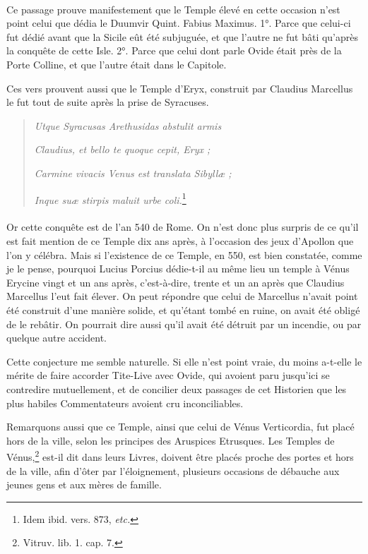 \documentclass[a4paper, 11pt, oneside, polutonikogreek, french]{article}
\begin{document}
\paragraph{}
Ce passage prouve manifestement que le Temple élevé en cette occasion n'est point celui que dédia le Duumvir Quint. Fabius Maximus. 1°. Parce que celui-ci fut dédié avant que la Sicile eût été subjuguée, et que l'autre ne fut bâti qu'après la conquête de cette Isle. 2°. Parce que celui dont parle Ovide était près de la Porte Colline, et que l'autre était dans le Capitole.

Ces vers prouvent aussi que le Temple d'Eryx, construit par Claudius Marcellus le fut tout de suite après la prise de Syracuses.
\begin{quotation}
\emph{Utque Syracusas Arethusidas abstulit armis}

\hspace*{5mm}\emph{Claudius, et bello te quoque cepit, Eryx ;}

\emph{Carmine vivacis Venus est translata Sibyllæ ;}

\hspace*{5mm}\emph{Inque suæ stirpis maluit urbe coli.}\footnote{Idem ibid. vers. 873, \emph{etc.}}
\end{quotation}
\paragraph{}
Or cette conquête est de l'an 540 de Rome. On n'est donc plus surpris de ce qu'il est fait mention de ce Temple dix ans après, à l'occasion des jeux d'Apollon que l'on y célébra. Mais si l'existence de ce Temple, en 550, est bien constatée, comme je le pense, pourquoi Lucius Porcius dédie-t-il au même lieu un temple à Vénus Erycine vingt et un ans après, c'est-à-dire, trente et un an après que Claudius Marcellus l'eut fait élever. On peut répondre que celui de Marcellus n'avait point été construit d'une manière solide, et qu'étant tombé en ruine, on avait été obligé de le rebâtir. On pourrait dire aussi qu'il avait été détruit par un incendie, ou par quelque autre accident.

Cette conjecture me semble naturelle. Si elle n'est point vraie, du moins a-t-elle le mérite de faire accorder Tite-Live avec Ovide, qui avoient paru jusqu'ici se contredire mutuellement, et de concilier deux passages de cet Historien que les plus habiles Commentateurs avoient cru inconciliables.

Remarquons aussi que ce Temple, ainsi que celui de Vénus Verticordia, fut placé hors de la ville, selon les principes des Aruspices Etrusques. Les Temples de Vénus,\footnote{Vitruv. lib. 1. cap. 7.} est-il dit dans leurs Livres, doivent être placés proche des portes et hors de la ville, afin d'ôter par l'éloignement, plusieurs occasions de débauche aux jeunes gens et aux mères de famille.
\end{document}
